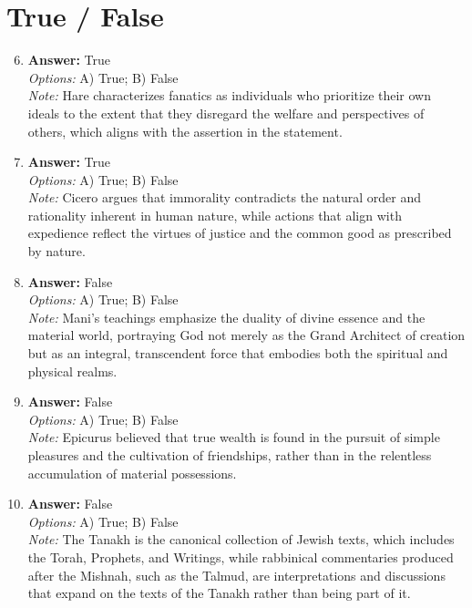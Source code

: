 \documentclass[12pt]{article}
\begin{document}
\section*{True / False}
\begin{enumerate}[label=\arabic*.]
\setcounter{enumi}{5}
\item \textbf{Answer:} True
\\ \textit{Options:} A) True; B) False
\\ \textit{Note:} Hare characterizes fanatics as individuals who prioritize their own ideals to the extent that they disregard the welfare and perspectives of others, which aligns with the assertion in the statement.
\item \textbf{Answer:} True
\\ \textit{Options:} A) True; B) False
\\ \textit{Note:} Cicero argues that immorality contradicts the natural order and rationality inherent in human nature, while actions that align with expedience reflect the virtues of justice and the common good as prescribed by nature.
\item \textbf{Answer:} False
\\ \textit{Options:} A) True; B) False
\\ \textit{Note:} Mani's teachings emphasize the duality of divine essence and the material world, portraying God not merely as the Grand Architect of creation but as an integral, transcendent force that embodies both the spiritual and physical realms.
\item \textbf{Answer:} False
\\ \textit{Options:} A) True; B) False
\\ \textit{Note:} Epicurus believed that true wealth is found in the pursuit of simple pleasures and the cultivation of friendships, rather than in the relentless accumulation of material possessions.
\item \textbf{Answer:} False
\\ \textit{Options:} A) True; B) False
\\ \textit{Note:} The Tanakh is the canonical collection of Jewish texts, which includes the Torah, Prophets, and Writings, while rabbinical commentaries produced after the Mishnah, such as the Talmud, are interpretations and discussions that expand on the texts of the Tanakh rather than being part of it.
\end{enumerate}
\end{document}
